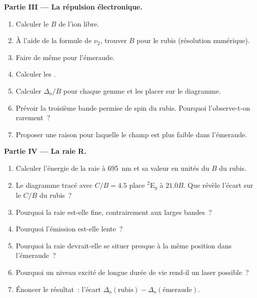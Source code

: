 \begin{problem}
\medskip\noindent\textbf{Partie III --- La répulsion électronique.}
\begin{enumerate}[resume]
  \item Calculer le $B$ de l'ion libre.
  \item À l'aide de la formule de $\nu_2$, trouver $B$ pour le rubis
        (résolution numérique).
  \item Faire de même pour l'émeraude.
  \item Calculer les .
  \item Calculer $\Delta_{\mathrm o}/B$ pour chaque gemme et les placer sur
        le diagramme.
  \item Prévoir la troisième bande permise de spin du rubis. Pourquoi
        l'observe-t-on rarement~?
  \item Proposer une raison pour laquelle le champ est plus faible dans
        l'émeraude.
\end{enumerate}

\medskip\noindent\textbf{Partie IV --- La raie R.}
\begin{enumerate}[resume]
  \item Calculer l'énergie de la raie à \qty{695}{nm} et sa valeur en
        unités du $B$ du rubis.
  \item Le diagramme tracé avec $C/B = 4.5$ place $^2$E$_g$ à $21.0B$. Que
        révèle l'écart sur le $C/B$ du rubis~?
  \item Pourquoi la raie est-elle fine, contrairement aux larges bandes~?
  \item Pourquoi l'émission est-elle lente~?
  \item Pourquoi la raie devrait-elle se situer presque à la même position
        dans l'émeraude~?
  \item Pourquoi un niveau excité de longue durée de vie rend-il un laser
        possible~?
  \item Énoncer le résultat~: l'écart $\Delta_{\mathrm o}(\text{rubis}) - \Delta_{\mathrm o}(\text{émeraude})$.
\end{enumerate}
\end{problem}
